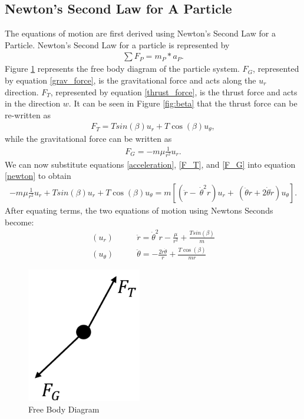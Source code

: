 \documentclass[]{article}
\begin{document}
\subsection{Newton's Second Law for A Particle}
The equations of motion are first derived using Newton's Second Law for a Particle. Newton's Second Law for a particle is represented by
\begin{align}
	\sum{F_{P}} = m_{P} * a_{P}. \label{newton}
\end{align}
\vspace{2mm}\newline
Figure \ref{fig:FBD} represents the free body diagram of the particle system. \(F_{G}\), represented by equation \ref{grav_force}, is the gravitational force and acts along the \(u_{r}\) direction. \(F_{T}\), represented by equation \ref{thrust_force}, is the thrust force and acts in the direction \(w\). It can be seen in Figure \ref{fig:beta} that the thrust force can be re-written as 
\begin{align}
	F_{T} = Tsin(\beta)u_{r} + T\cos(\beta)u_{\theta}, \label{F_T}
\end{align}
while the gravitational force can be written as
\begin{align}
	F_{G} = -m\mu\frac{1}{r^2}u_{r}. \label{F_G}
\end{align}
We can now substitute equations \ref{acceleration},  \ref{F_T}, and \ref{F_G} into equation \ref{newton} to obtain
\begin{align*}
	 -m\mu\frac{1}{r^2}u_{r} + Tsin(\beta)u_{r} + T\cos(\beta)u_{\theta} = m[(\ddot{r} -\ \dot{\theta}^2r)u_{r} +\ (\ddot{\theta}r+2\dot{\theta}\dot{r})u_{\theta}]. 
\end{align*}
After equating terms, the two equations of motion using Newtons Seconds become:
\begin{align}
	(u_{r})\qquad      &  \ddot{r}      = \dot{\theta}^2r - \frac{\mu}{r^2} + \frac{Tsin(\beta)}{m} \label{eom1}\\
	(u_{\theta})\qquad &  \ddot{\theta} = -\frac{2\dot{r}\dot{\theta}}{r}   + \frac{T\cos(\beta)}{mr} \label{eom2}
\end{align}
\begin{figure}
    \centering
	\includegraphics[width=50mm,scale=0.5]{FBD.png}
	\caption{Free Body Diagram}
	\label{fig:FBD}
\end{figure}
\end{document}
